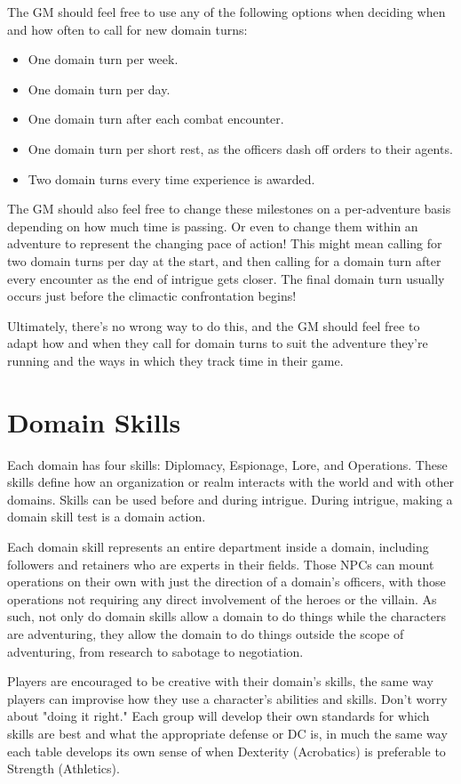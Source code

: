 \documentclass[10pt,a4paper,twoside,bg=print,twocolumn,openany,nodeprecatedcode]{dndbook}
\begin{document}
The GM should feel free to use any of the following options when deciding when and how often to call for new domain turns:


\begin{itemize}
\item One domain turn per week.
\item One domain turn per day.
\item One domain turn after each combat encounter.
\item One domain turn per short rest, as the officers dash off orders to their agents.
\item Two domain turns every time experience is awarded.
\end{itemize}

The GM should also feel free to change these milestones on a per-adventure basis depending on how much time is passing. Or even to change them within an adventure to represent the changing pace of action! This might mean calling for two domain turns per day at the start, and then calling for a domain turn after every encounter as the end of intrigue gets closer. The final domain turn usually occurs just before the climactic confrontation begins!

Ultimately, there's no wrong way to do this, and the GM should feel free to adapt how and when they call for domain turns to suit the adventure they're running and the ways in which they track time in their game.

\section{Domain Skills}
Each domain has four skills: Diplomacy, Espionage, Lore, and Operations. These skills define how an organization or realm interacts with the world and with other domains. Skills can be used before and during intrigue. During intrigue, making a domain skill test is a domain action.

Each domain skill represents an entire department inside a domain, including followers and retainers who are experts in their fields. Those NPCs can mount operations on their own with just the direction of a domain's officers, with those operations not requiring any direct involvement of the heroes or the villain. As such, not only do domain skills allow a domain to do things while the characters are adventuring, they allow the domain to do things outside the scope of adventuring, from research to sabotage to negotiation.

Players are encouraged to be creative with their domain's skills, the same way players can improvise how they use a character's abilities and skills. Don't worry about "doing it right." Each group will develop their own standards for which skills are best and what the appropriate defense or DC is, in much the same way each table develops its own sense of when Dexterity (Acrobatics) is preferable to Strength (Athletics).
\end{document}
